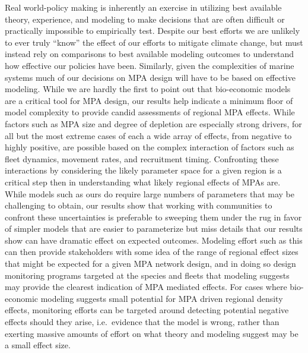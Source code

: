 \documentclass[twoside,12pt,final]{ucthesis-CA2012}
\begin{document}
\begin{ucmainmatter}
Real world-policy making is inherently an exercise in utilizing best
available theory, experience, and modeling to make decisions that are
often difficult or practically impossible to empirically test. Despite
our best efforts we are unlikely to ever truly ``know'' the effect of
our efforts to mitigate climate change, but must instead rely on
comparisons to best available modeling outcomes to understand how
effective our policies have been. Similarly, given the complexities of
marine systems much of our decisions on MPA design will have to be based
on effective modeling. While we are hardly the first to point out that
bio-economic models are a critical tool for MPA design, our results help
indicate a minimum floor of model complexity to provide candid
assessments of regional MPA effects. While factors such as MPA size and
degree of depletion are especially strong drivers, for all but the most
extreme cases of each a wide array of effects, from negative to highly
positive, are possible based on the complex interaction of factors such
as fleet dynamics, movement rates, and recruitment timing. Confronting
these interactions by considering the likely parameter space for a given
region is a critical step then in understanding what likely regional
effects of MPAs are. While models such as ours do require large numbers
of parameters that may be challenging to obtain, our results show that
working with communities to confront these uncertainties is preferable
to sweeping them under the rug in favor of simpler models that are
easier to parameterize but miss details that our results show can have
dramatic effect on expected outcomes. Modeling effort such as this can
then provide stakeholders with some idea of the range of regional effect
sizes that might be expected for a given MPA network design, and in
doing so design monitoring programs targeted at the species and fleets
that modeling suggests may provide the clearest indication of MPA
mediated effects. For cases where bio-economic modeling suggests small
potential for MPA driven regional density effects, monitoring efforts
can be targeted around detecting potential negative effects should they
arise, i.e.~evidence that the model is wrong, rather than exerting
massive amounts of effort on what theory and modeling suggest may be a
small effect size.


\end{ucmainmatter}
\end{document}
